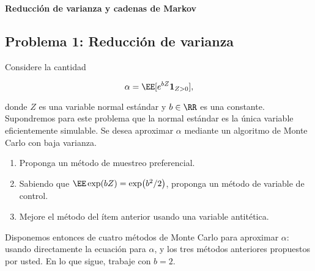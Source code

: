 \vspace{0.3cm}
\begin{center}
{\huge \textbf{Reducción de varianza y cadenas de Markov}}
\end{center}

\subsection*{Problema 1: Reducción de varianza}
Considere la cantidad

$$ \alpha = \EE [ e^{bZ}\boldsymbol{1}_{Z>0}],$$

donde $Z$ es una variable normal estándar y $b\in\RR$ es una constante. Supondremos para este problema que la normal estándar es la única variable eficientemente simulable. Se desea aproximar $\alpha$ mediante un algoritmo de Monte Carlo con baja varianza.

\begin{enumerate}
	\item Proponga un método de muestreo preferencial.
	
	\item Sabiendo que $\EE \exp(b Z) = \exp(b^2/2)$, proponga un método de variable de control.
	
	\item Mejore el método del ítem anterior usando una variable antitética.
\end{enumerate}

Disponemos entonces de cuatro métodos de Monte Carlo para aproximar $\alpha$: usando directamente la ecuación para $\alpha$, y los tres métodos anteriores propuestos por usted. En lo que sigue, trabaje con $b=2$.

